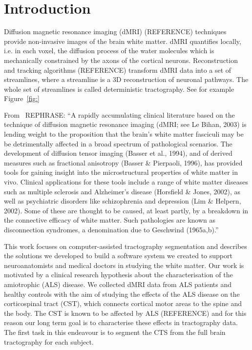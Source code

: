 \section{Introduction}
\label{sec:introduction}

Diffusion magnetic resonance imaging (dMRI) (REFERENCE) techniques
provide non-invasive images of the brain white matter. dMRI quantifies
locally, i.e. in each voxel, the diffusion process of the water
molecules which is mechanically constrained by the axons of the
cortical neurons. Reconstruction and tracking algorithms (REFERENCE)
transform dMRI data into a set of streamlines, where a streamline is a
3D reconstruction of neuronal pathways. The whole set of streamlines
is called deterministic tractography. See for example
Figure~\ref{fig:}

From~\cite{clayden2009reproducibility} REPHRASE: ``A rapidly
accumulating clinical literature based on the technique of diffusion
magnetic resonance imaging (dMRI; see Le Bihan, 2003) is lending
weight to the proposition that the brain’s white matter fasciculi may
be be detrimentally affected in a broad spectrum of pathological
scenarios. The development of diffusion tensor imaging (Basser et al.,
1994), and of derived measures such as fractional anisotropy (Basser
\& Pierpaoli, 1996), has provided tools for gaining insight into the
microstructural properties of white matter in vivo. Clinical
applications for these tools include a range of white matter diseases
such as multiple sclerosis and Alzheimer’s disease (Horsfield \&
Jones, 2002), as well as psychiatric disorders like schizophrenia and
depression (Lim \& Helpern, 2002). Some of these are thought to be
caused, at least partly, by a breakdown in the connective efficacy of
white matter. Such pathologies are known as disconnection syndromes, a
denomination due to Geschwind (1965a,b).''

This work focuses on computer-assisted tractography segmentation and
describes the solutions we developed to build a software system we
created to support neuroanatomists and medical doctors in studying the
white matter. Our work is motivated by a clinical research hypothesis
about the characterisation of the amiotrophic (ALS) disease. We
collected dMRI data from ALS patients and healthy controls with the
aim of studying the effects of the ALS disease on the corticospinal
tract (CST), which connects cortical motor areas to the spine and the
body. The CST is known to be affected by ALS (REFERENCE) and for this
reason our long term goal is to characterise these effects in
tractography data. The first task in this endeavour is to segment the
CTS from the full brain tractography for each subject.


